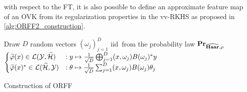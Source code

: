 \documentclass[twoside,11pt]{article}
\begin{document}
with respect to the \acl{FT}, it is also possible to define an approximate
feature map of an \acl{OVK} from its regularization properties in the
\acs{vv-RKHS} as proposed in \cref{alg:ORFF2_construction}.
\begin{center}
    \begin{algorithm2e}[t!]\label{alg:ORFF2_construction}
        \SetAlgoLined
        \BlankLine
        Draw $D$ random vectors $(\omega_j)_{j=1}^D$ \ac{iid}~from the
        probability law ${\mathbf{{Pr}}}_{\widehat{\mathbf{Haar}},\rho}$\;
        \Return $
        \begin{cases}
            \tildePhi{\omega}(x) \in\mathcal{L}(\mathcal{Y}, \tildeH{\omega})
            &: y \mapsto \frac{1}{\sqrt{D}}\Vect_{j=1}^D\pairing{x,
            \omega_j}B(\omega_j)^\adjoint y \\
            \tildePhi{\omega}(x)^\adjoint \in\mathcal{L}(\tildeH{\omega},
            \mathcal{Y}) &: \theta \mapsto \frac{1}{\sqrt{D}} \sum_{j=1}^D
            \pairing{x, \omega_j}B(\omega_j)\theta_j
        \end{cases}$\;
        \caption{Construction of \acs{ORFF}}
    \end{algorithm2e}
\end{center}

\end{document}
